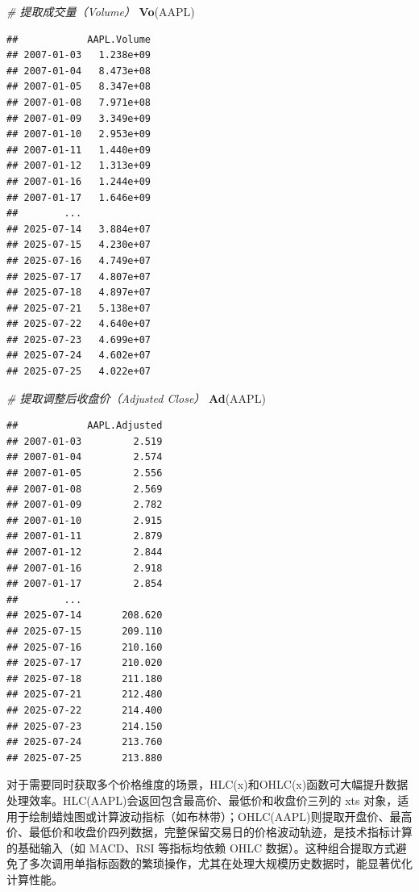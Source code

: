 \documentclass[]{ctexbook}
\newenvironment{Shaded}{\begin{snugshade}}{\end{snugshade}}
\newcommand{\CommentTok}[1]{\textcolor[rgb]{0.56,0.35,0.01}{\textit{#1}}}
\newcommand{\FunctionTok}[1]{\textcolor[rgb]{0.13,0.29,0.53}{\textbf{#1}}}
\newcommand{\NormalTok}[1]{#1}
\begin{document}
\begin{Shaded}
\begin{Highlighting}[]
\CommentTok{\# 提取成交量（Volume）}
\FunctionTok{Vo}\NormalTok{(AAPL)}
\end{Highlighting}
\end{Shaded}

\begin{verbatim}
##            AAPL.Volume
## 2007-01-03   1.238e+09
## 2007-01-04   8.473e+08
## 2007-01-05   8.347e+08
## 2007-01-08   7.971e+08
## 2007-01-09   3.349e+09
## 2007-01-10   2.953e+09
## 2007-01-11   1.440e+09
## 2007-01-12   1.313e+09
## 2007-01-16   1.244e+09
## 2007-01-17   1.646e+09
##        ...            
## 2025-07-14   3.884e+07
## 2025-07-15   4.230e+07
## 2025-07-16   4.749e+07
## 2025-07-17   4.807e+07
## 2025-07-18   4.897e+07
## 2025-07-21   5.138e+07
## 2025-07-22   4.640e+07
## 2025-07-23   4.699e+07
## 2025-07-24   4.602e+07
## 2025-07-25   4.022e+07
\end{verbatim}

\begin{Shaded}
\begin{Highlighting}[]
\CommentTok{\# 提取调整后收盘价（Adjusted Close）}
\FunctionTok{Ad}\NormalTok{(AAPL)}
\end{Highlighting}
\end{Shaded}

\begin{verbatim}
##            AAPL.Adjusted
## 2007-01-03         2.519
## 2007-01-04         2.574
## 2007-01-05         2.556
## 2007-01-08         2.569
## 2007-01-09         2.782
## 2007-01-10         2.915
## 2007-01-11         2.879
## 2007-01-12         2.844
## 2007-01-16         2.918
## 2007-01-17         2.854
##        ...              
## 2025-07-14       208.620
## 2025-07-15       209.110
## 2025-07-16       210.160
## 2025-07-17       210.020
## 2025-07-18       211.180
## 2025-07-21       212.480
## 2025-07-22       214.400
## 2025-07-23       214.150
## 2025-07-24       213.760
## 2025-07-25       213.880
\end{verbatim}

对于需要同时获取多个价格维度的场景，HLC(x)和OHLC(x)函数可大幅提升数据处理效率。HLC(AAPL)会返回包含最高价、最低价和收盘价三列的 xts 对象，适用于绘制蜡烛图或计算波动指标（如布林带）；OHLC(AAPL)则提取开盘价、最高价、最低价和收盘价四列数据，完整保留交易日的价格波动轨迹，是技术指标计算的基础输入（如 MACD、RSI 等指标均依赖 OHLC 数据）。这种组合提取方式避免了多次调用单指标函数的繁琐操作，尤其在处理大规模历史数据时，能显著优化计算性能。
\end{document}
